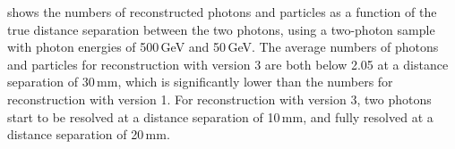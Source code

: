 
 shows the numbers of reconstructed photons and particles as a function of  the true distance separation between the two photons, using a two-photon sample with photon energies of  500\,GeV and 50\,GeV.  The average numbers of photons and particles for reconstruction with \pandora version 3 are both below 2.05 at a distance separation of 30\,mm, which is significantly lower than the numbers for reconstruction with \pandora version 1. For reconstruction with \pandora version 3, two photons start to be resolved at a distance separation of 10\,mm, and fully resolved at a distance separation of 20\,mm.






